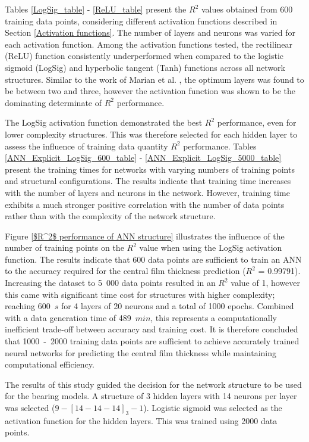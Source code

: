 Tables \ref{LogSig_table} - \ref{ReLU_table} present the $R^2$ values obtained from 600 training data points, considering different activation functions described in Section \ref{Activation functions}. The number of layers and neurons was varied for each activation function. Among the activation functions tested, the rectilinear (ReLU) function consistently underperformed when compared to the logistic sigmoid (LogSig) and hyperbolic tangent (Tanh) functions across all network structures.  Similar to the work of Marian et al. \cite{Marian2021}, the optimum layers was found to be between two and three, however the activation function was shown to be the dominating determinate of $R^2$ performance.

The LogSig activation function demonstrated the best $R^2$ performance, even for lower complexity structures. This was therefore selected for each hidden layer to assess the influence of training data quantity $R^2$ performance. Tables \ref{ANN_Explicit_LogSig_600_table} - \ref{ANN_Explicit_LogSig_5000_table} present the training times for networks with varying numbers of training points and structural configurations. The results indicate that training time increases with the number of layers and neurons in the network. However, training time exhibits a much stronger positive correlation with the number of data points rather than with the complexity of the network structure.

Figure \ref{$R^2$ performance of ANN structure} illustrates the influence of the number of training points on the $R^2$ value when using the LogSig activation function. The results indicate that 600 data points are sufficient to train an ANN to the accuracy required for the central film thickness prediction ($R^2$ = 0.99791). Increasing the dataset to 5~000 data points resulted in an $R^2$ value of 1, however this came with significant time cost for structures with higher complexity; reaching 600~$s$ for 4 layers of 20 neurons and a total of 1000 epochs. Combined with a data generation time of 489~$min$, this represents a computationally inefficient trade-off between accuracy and training cost. It is therefore concluded that 1000~-~2000 training data points are sufficient to achieve accurately trained neural networks for predicting the central film thickness while maintaining computational efficiency.

The results of this study guided the decision for the network structure to be used for the bearing models. A structure of 3 hidden layers with 14 neurons per layer was selected ($9-[14-14-14]_3-1$). Logistic sigmoid was selected as the activation function for the hidden layers. This was trained using 2000 data points.

